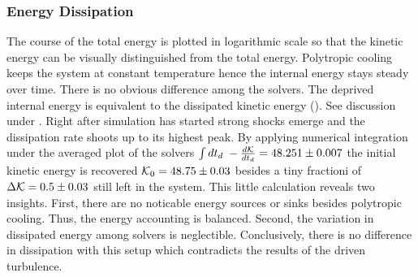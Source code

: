 
\subsubsection{Energy Dissipation}
\label{sec:decayturb-ekin-diss}
The course of the total energy  is plotted in
logarithmic scale so that the kinetic energy can be visually distinguished from
the total energy. Polytropic cooling keeps the system at constant temperature
hence the internal energy stays steady over time. There is no obvious
difference among the solvers.  The deprived internal energy is equivalent to
the dissipated kinetic energy (). See
discussion under . Right after simulation has
started strong shocks emerge and the dissipation rate shoots up to its highest
peak.  By applying numerical integration under the averaged plot of the solvers
$\int dt_d \; -\frac{d\mathcal{K}}{dt_d} = 48.251 \pm 0.007$  the initial kinetic
energy is recovered $\mathcal{K}_0 = 48.75 \pm 0.03$ besides a tiny fractioni of
$\Delta \mathcal{K} = 0.5 \pm 0.03$ still left in the system. This little calculation
reveals two insights. First, there are no noticable energy sources or sinks
besides polytropic cooling. Thus, the energy accounting is balanced. Second,
the variation in dissipated energy among solvers is neglectible. Conclusively,
there is no difference in dissipation with this setup which contradicts the
results of the driven turbulence.


